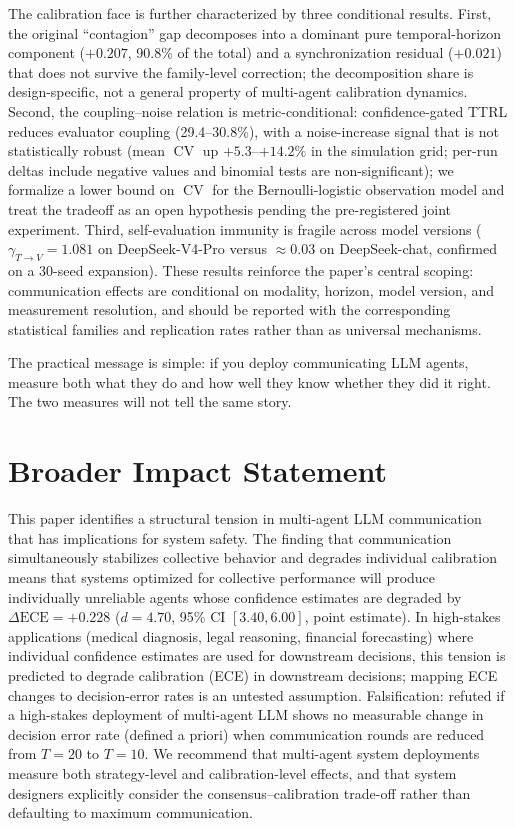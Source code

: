 \documentclass[11pt]{article}
\DeclareMathOperator{\CV}{CV}
\begin{document}
The calibration face is further characterized by three conditional results. First, the original ``contagion'' gap decomposes into a dominant pure temporal-horizon component ($+0.207$, 90.8\% of the total) and a synchronization residual ($+0.021$) that does not survive the family-level correction; the decomposition share is design-specific, not a general property of multi-agent calibration dynamics. Second, the coupling--noise relation is metric-conditional: confidence-gated TTRL reduces evaluator coupling (29.4--30.8\%), with a noise-increase signal that is not statistically robust (mean $\CV$ up $+5.3$--$+14.2\%$ in the simulation grid; per-run deltas include negative values and binomial tests are non-significant); we formalize a lower bound on $\CV$ for the Bernoulli-logistic observation model and treat the tradeoff as an open hypothesis pending the pre-registered joint experiment. Third, self-evaluation immunity is fragile across model versions ($\gamma_{T\to V}{=}1.081$ on DeepSeek-V4-Pro versus $\approx 0.03$ on DeepSeek-chat, confirmed on a 30-seed expansion). These results reinforce the paper's central scoping: communication effects are conditional on modality, horizon, model version, and measurement resolution, and should be reported with the corresponding statistical families and replication rates rather than as universal mechanisms.

The practical message is simple: if you deploy communicating LLM agents, measure both what they do and how well they know whether they did it right. The two measures will not tell the same story.

\section*{Broader Impact Statement}

This paper identifies a structural tension in multi-agent LLM communication that has implications for system safety. The finding that communication simultaneously stabilizes collective behavior and degrades individual calibration means that systems optimized for collective performance will produce individually unreliable agents whose confidence estimates are degraded by $\Delta\text{ECE} = +0.228$ ($d = 4.70$, 95\% CI $[3.40, 6.00]$, point estimate). In high-stakes applications (medical diagnosis, legal reasoning, financial forecasting) where individual confidence estimates are used for downstream decisions, this tension is predicted to degrade calibration (ECE) in downstream decisions; mapping ECE changes to decision-error rates is an untested assumption. Falsification: refuted if a high-stakes deployment of multi-agent LLM shows no measurable change in decision error rate (defined a priori) when communication rounds are reduced from $T = 20$ to $T = 10$. We recommend that multi-agent system deployments measure both strategy-level and calibration-level effects, and that system designers explicitly consider the consensus--calibration trade-off rather than defaulting to maximum communication.
\end{document}

